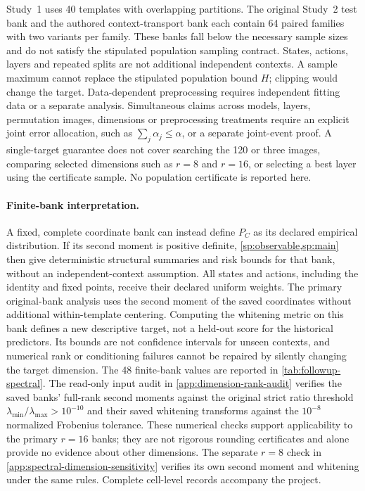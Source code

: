 Study~1 uses 40 templates with overlapping partitions. The original Study~2 test bank and the authored context-transport bank each contain 64 paired families with two variants per family. These banks fall below the necessary sample sizes and do not satisfy the stipulated population sampling contract. States, actions, layers and repeated splits are not additional independent contexts. A sample maximum cannot replace the stipulated population bound $H$; clipping would change the target. Data-dependent preprocessing requires independent fitting data or a separate analysis. Simultaneous claims across models, layers, permutation images, dimensions or preprocessing treatments require an explicit joint error allocation, such as $\sum_j\alpha_j\le\alpha$, or a separate joint-event proof. A single-target guarantee does not cover searching the 120 or three images, comparing selected dimensions such as $r=8$ and $r=16$, or selecting a best layer using the certificate sample. No population certificate is reported here.

\paragraph{Finite-bank interpretation.}
\label{sp:finite-bank}
A fixed, complete coordinate bank can instead define $P_C$ as its declared empirical distribution. If its second moment is positive definite, \cref{sp:observable,sp:main} then give deterministic structural summaries and risk bounds for that bank, without an independent-context assumption. All states and actions, including the identity and fixed points, receive their declared uniform weights. The primary original-bank analysis uses the second moment of the saved coordinates without additional within-template centering. Computing the whitening metric on this bank defines a new descriptive target, not a held-out score for the historical predictors. Its bounds are not confidence intervals for unseen contexts, and numerical rank or conditioning failures cannot be repaired by silently changing the target dimension. The 48 finite-bank values are reported in \cref{tab:followup-spectral}. The read-only input audit in \cref{app:dimension-rank-audit} verifies the saved banks' full-rank second moments against the original strict ratio threshold $\lambda_{\min}/\lambda_{\max}>10^{-10}$ and their saved whitening transforms against the $10^{-8}$ normalized Frobenius tolerance. These numerical checks support applicability to the primary $r=16$ banks; they are not rigorous rounding certificates and alone provide no evidence about other dimensions. The separate $r=8$ check in \cref{app:spectral-dimension-sensitivity} verifies its own second moment and whitening under the same rules. Complete cell-level records accompany the project.

